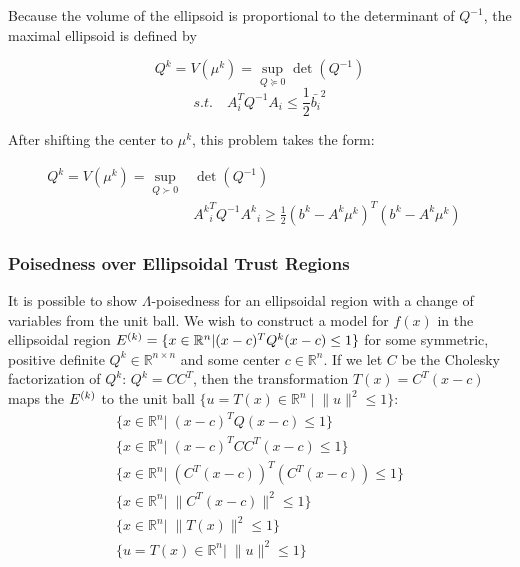 Because the volume of the ellipsoid is proportional to the determinant of $Q^{-1}$, the maximal ellipsoid is defined by

\[
Q^k = V(\mu^k) = \sup_{Q \succeq 0} \det(Q^{-1})
\]
\[
s.t. \quad A_i^T Q^{-1} A_i \le \frac 1 2 \bar{b_i}^2
\]



After shifting the center to $\mu^{k}$, this problem takes the form:

\begin{center}
\begin{align}
\label{ellipse_1}
Q^k = V(\mu^k) = \sup_{Q \succ 0} & \det(Q^{-1}) & \\
  & {A^k}_i^T Q^{-1} {A^k}_i \ge \frac 1 2 (b^k - A^k\mu^{k})^T(b^k - A^k \mu^{k}) & \nonumber
\end{align}
\end{center}



%

\subsubsection{Poisedness over Ellipsoidal Trust Regions}
\label{ellipsoidal_lambda}

It is possible to show $\Lambda$-poisedness for an ellipsoidal region with a change of variables from the unit ball.
We wish to construct a model for $f(x)$ in the ellipsoidal region
${E^{(k)}} = \{x \in \mathbb R^n | (x - c)^TQ^{k}(x - c) \le 1 \}$ for some symmetric, positive definite
$Q^{k} \in \mathbb R^{n\times n}$ and some center $c \in \mathbb R^n$.
If we let $C$ be the Cholesky factorization of $Q^{k}$: $Q^{k} = CC^T$,
then the transformation $T(x) = C^T(x - c)$ maps the $ {E^{(k)}} $ to the unit ball 
$\{u = T(x) \in \mathbb R^n \; | \; \|u\|^2 \le 1\}$:
\begin{align*}
\{x \in \mathbb R^n | \; (x - c)^TQ(x - c) \le 1 \} \\
\{x \in \mathbb R^n | \; (x - c)^TCC^T(x - c) \le 1 \} \\
\{x \in \mathbb R^n | \; (C^T(x - c))^T(C^T(x - c)) \le 1 \} \\
\{x \in \mathbb R^n | \; \|C^T(x - c)\|^2 \le 1 \} \\
\{x \in \mathbb R^n | \; \|T(x)\|^2 \le 1 \} \\
\{u = T(x) \in \mathbb R^n | \; \|u\|^2 \le 1 \} \\
\end{align*}

